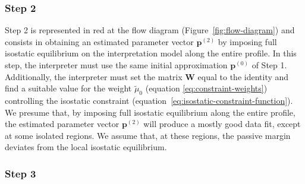 \documentclass[manuscript,revised]{geophysics}
\begin{document}
\subsubsection{Step 2}

Step 2 is represented in red at the flow diagram (Figure~\ref{fig:flow-diagram})
and consists in obtaining an estimated parameter vector $\mathbf{p}^{(2)}$
by imposing full isostatic equilibrium on the interpretation model along the entire profile.
In this step, the interpreter must use the same initial approximation $\mathbf{p}^{(0)}$
of Step 1.
Additionally, the interpreter must set the matrix $\mathbf{W}$
equal to the identity and find a suitable value for the weight $\tilde{\mu}_{0}$ 
(equation \ref{eq:constraint-weights}) controlling the isostatic constraint 
(equation~\ref{eq:isostatic-constraint-function}).
We presume that, by imposing full isostatic equilibrium along the entire profile,
the estimated parameter vector $\mathbf{p}^{(2)}$ will produce a mostly good data fit,
except at some isolated regions. 
We assume that, at these regions, the passive margin deviates 
from the local isostatic equilibrium.

\subsubsection{Step 3}
\end{document}
